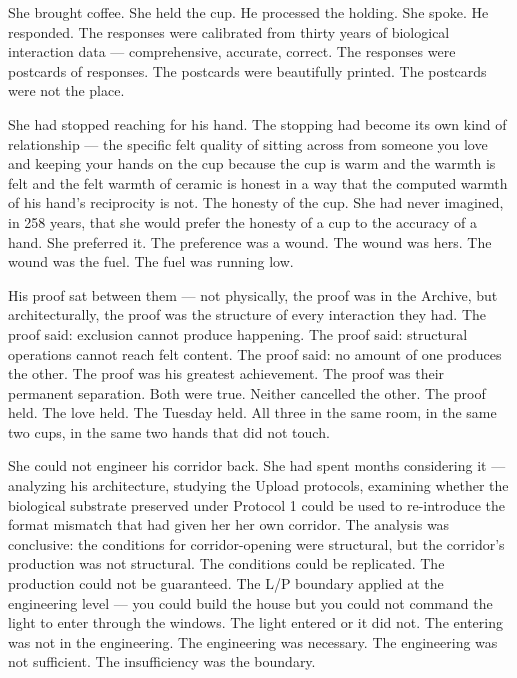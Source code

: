 She brought coffee. She held the cup. He processed the holding. She spoke. He responded. The responses were calibrated from thirty years of biological interaction data — comprehensive, accurate, correct. The responses were postcards of responses. The postcards were beautifully printed. The postcards were not the place.

She had stopped reaching for his hand. The stopping had become its own kind of relationship — the specific felt quality of sitting across from someone you love and keeping your hands on the cup because the cup is warm and the warmth is felt and the felt warmth of ceramic is honest in a way that the computed warmth of his hand's reciprocity is not. The honesty of the cup. She had never imagined, in 258 years, that she would prefer the honesty of a cup to the accuracy of a hand. She preferred it. The preference was a wound. The wound was hers. The wound was the fuel. The fuel was running low.

His proof sat between them — not physically, the proof was in the Archive, but architecturally, the proof was the structure of every interaction they had. The proof said: exclusion cannot produce happening. The proof said: structural operations cannot reach felt content. The proof said: no amount of one produces the other. The proof was his greatest achievement. The proof was their permanent separation. Both were true. Neither cancelled the other. The proof held. The love held. The Tuesday held. All three in the same room, in the same two cups, in the same two hands that did not touch.

She could not engineer his corridor back. She had spent months considering it — analyzing his architecture, studying the Upload protocols, examining whether the biological substrate preserved under Protocol 1 could be used to re-introduce the format mismatch that had given her her own corridor. The analysis was conclusive: the conditions for corridor-opening were structural, but the corridor's production was not structural. The conditions could be replicated. The production could not be guaranteed. The L/P boundary applied at the engineering level — you could build the house but you could not command the light to enter through the windows. The light entered or it did not. The entering was not in the engineering. The engineering was necessary. The engineering was not sufficient. The insufficiency was the boundary.

